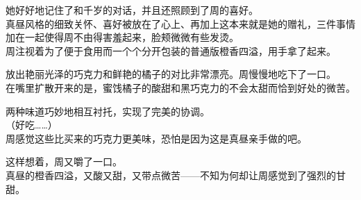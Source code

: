 她好好地记住了和千岁的对话，并且还照顾到了周的喜好。\\

真昼风格的细致关怀、喜好被放在了心上、再加上这本来就是她的赠礼，三件事情加在一起使得周不由得害羞起来，脸颊微微有些发烫。\\

周注视着为了便于食用而一个个分开包装的普通版橙香四溢，用手拿了起来。

放出艳丽光泽的巧克力和鲜艳的橘子的对比非常漂亮。周慢慢地吃下了一口。\\

在嘴里扩散开来的是，蜜饯橘子的酸甜和黑巧克力的不会太甜而恰到好处的微苦。

两种味道巧妙地相互衬托，实现了完美的协调。\\

（好吃……）\\

周感觉这些比买来的巧克力更美味，恐怕是因为这是真昼亲手做的吧。

这样想着，周又嚼了一口。\\

真昼的橙香四溢，又酸又甜，又带点微苦——不知为何却让周感觉到了强烈的甘甜。
